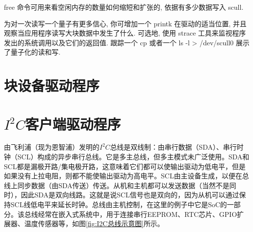 \documentclass[lang=cn,newtx,10pt,scheme=chinese]{elegantbook}
\begin{document}
free 命令可用来看空闲内存的数量如何缩短和扩张的, 依据有多少数据写入 scull.

为对一次读写一个量子有更多信心, 你可增加一个 printk 在驱动的适当位置, 并且观察当应用程序读写大块数据中发生了什么. 可选地, 使用 strace 工具来监视程序发出的系统调用以及它们的返回值. 跟踪一个 cp 或者一个 ls -l > /dev/scull0 展示了量子化的读和写.

\chapter{块设备驱动程序}

\chapter{\texorpdfstring{$I^2C$客户端驱动程序}{I2C客户端驱动程序}}

由飞利浦（现为恩智浦）发明的$I^2C$总线是双线制：由串行数据（SDA）、串行时钟（SCL）构成的异步串行总线。它是多主总线，但多主模式未广泛使用。SDA和SCL都是漏极开路/集电极开路，这意味着它们都可以使输出驱动为低电平，但是如果没有上拉电阻，则都不能使输出驱动为高电平。SCL由主设备生成，以便在总线上同步数据（由SDA传送）传送。从机和主机都可以发送数据（当然不是同时），因此SDA是双向线路。这就是说SCL信号也是双向的，因为从机可以通过保持SCL线低电平来延长时钟。总线由主机控制，在这里的例子中它是SoC的一部分。该总线经常在嵌入式系统中，用于连接串行EEPROM、RTC芯片、GPIO扩展器、温度传感器等，如图\ref{fig:I2C总线示意图}所示。
\end{document}
